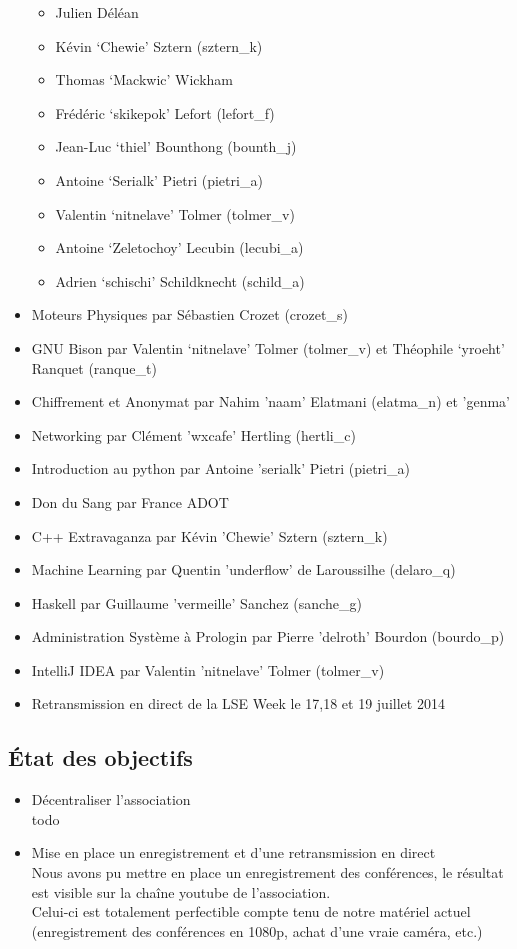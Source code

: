\documentclass[12pt]{report}
\begin{document}
\begin{itemize}
\begin{itemize}
        \item Julien Déléan
        \item Kévin `Chewie' Sztern (sztern\_k)
        \item Thomas `Mackwic' Wickham
        \item Frédéric `skikepok' Lefort (lefort\_f)
        \item Jean-Luc `thiel' Bounthong (bounth\_j)
        \item Antoine `Serialk' Pietri (pietri\_a)
        \item Valentin `nitnelave' Tolmer (tolmer\_v)
        \item Antoine `Zeletochoy' Lecubin (lecubi\_a)
        \item Adrien `schischi' Schildknecht (schild\_a)
      \end{itemize}
    \item Moteurs Physiques par Sébastien Crozet (crozet\_s)
    \item GNU Bison par Valentin `nitnelave' Tolmer (tolmer\_v) et Théophile `yroeht' Ranquet (ranque\_t)
    \item Chiffrement et Anonymat par Nahim 'naam' Elatmani (elatma\_n) et 'genma'
    \item Networking par Clément 'wxcafe' Hertling (hertli\_c)
    \item Introduction au python par Antoine 'serialk' Pietri (pietri\_a)
    \item Don du Sang par France ADOT
    \item C++ Extravaganza par Kévin 'Chewie' Sztern (sztern\_k)
    \item Machine Learning par Quentin 'underflow' de Laroussilhe (delaro\_q)
    \item Haskell par Guillaume 'vermeille' Sanchez (sanche\_g)
    \item Administration Système à Prologin par Pierre 'delroth' Bourdon
            (bourdo\_p)
    \item IntelliJ IDEA par Valentin 'nitnelave' Tolmer (tolmer\_v)
    \item Retransmission en direct de la LSE Week le 17,18 et 19 juillet 2014
  \end{itemize}
    \subsection{État des objectifs}
    \begin{itemize}
            \item Décentraliser l'association \\
                    todo
            \item Mise en place un enregistrement et d'une retransmission en
                   direct\\
                   Nous avons pu mettre en place un enregistrement des
                   conférences, le résultat est visible sur la chaîne youtube
                   de l'association.\\
                   Celui-ci est totalement perfectible compte tenu de notre
                   matériel actuel (enregistrement des conférences en 1080p,
                   achat d'une vraie caméra, etc.)
    \end{itemize}
\end{document}
